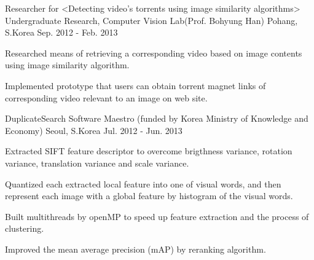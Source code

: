 

\begin{cventries}

  \cventry
    {Researcher for <Detecting video’s torrents using image similarity algorithms>} %
    {Undergraduate Research, Computer Vision Lab(Prof. Bohyung Han)} %
    {Pohang, S.Korea} %
    {Sep. 2012 - Feb. 2013} %
    {
      \begin{cvitems} %
        \item {Researched means of retrieving a corresponding video based on image contents using image similarity algorithm.}
        \item {Implemented prototype that users can obtain torrent magnet links of corresponding video relevant to an image on web site.}
      \end{cvitems}
    }

  \cventry
    {DuplicateSearch} %
    {Software Maestro (funded by Korea Ministry of Knowledge and Economy)} %
    {Seoul, S.Korea} %
    {Jul. 2012 - Jun. 2013} %
    {
      \begin{cvitems} %
        \item {Extracted SIFT feature descriptor to overcome brigthness variance, rotation variance, translation variance and scale variance.}
        \item {Quantized each extracted local feature into one of visual words, and then represent each image with a global feature by histogram of the visual words.}
        \item {Built multithreads by openMP to speed up feature extraction and the process of clustering.}
        \item {Improved the mean average precision (mAP) by reranking algorithm.}
      \end{cvitems}
    }


\end{cventries}
